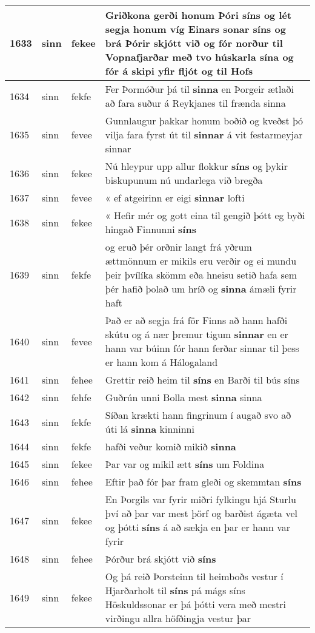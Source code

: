 \documentclass{article}
\begin{document}
\begin{longtable}{p{1cm}|p{1cm}|p{1cm}|p{13cm}}
\hline
1633&sinn&fekee&Griðkona gerði honum Þóri \textbf{síns} og lét segja honum víg Einars sonar síns og brá Þórir skjótt við og fór norður til Vopnafjarðar með tvo húskarla sína og fór á skipi yfir fljót og til Hofs\\
\hline
1634&sinn&fekfe&Fer Þormóður þá til \textbf{sinna} en Þorgeir ætlaði að fara suður á Reykjanes til frænda sinna\\
\hline
1635&sinn&fevee&Gunnlaugur þakkar honum boðið og kveðst þó vilja fara fyrst út til \textbf{sinnar} á vit festarmeyjar sinnar\\
\hline
1636&sinn&fekee&Nú hleypur upp allur flokkur \textbf{síns} og þykir biskupunum nú undarlega við bregða\\
\hline
1637&sinn&fevee&« ef atgeirinn er eigi \textbf{sinnar} lofti\\
\hline
1638&sinn&fekee&« Hefir mér og gott eina til gengið þótt eg byði hingað Finnunni \textbf{síns} \\
\hline
1639&sinn&fekfe&og eruð þér orðnir langt frá yðrum ættmönnum er mikils eru verðir og ei mundu þeir þvílíka skömm eða hneisu setið hafa sem þér hafið þolað um hríð og \textbf{sinna} ámæli fyrir haft\\
\hline
1640&sinn&fevee&Það er að segja frá för Finns að hann hafði skútu og á nær þremur tigum \textbf{sinnar} en er hann var búinn fór hann ferðar sinnar til þess er hann kom á Hálogaland\\
\hline
1641&sinn&fehee&Grettir reið heim til \textbf{síns} en Barði til bús síns\\
\hline
1642&sinn&fehfe&Guðrún unni Bolla mest \textbf{sinna} sinna\\
\hline
1643&sinn&fekfe&Síðan krækti hann fingrinum í augað svo að úti lá \textbf{sinna} kinninni\\
\hline
1644&sinn&fekfe&hafði veður komið mikið \textbf{sinna} \\
\hline
1645&sinn&fekee&Þar var og mikil ætt \textbf{síns} um Foldina\\
\hline
1646&sinn&fehee&Eftir það fór þar fram gleði og skemmtan \textbf{síns} \\
\hline
1647&sinn&fekee&En Þorgils var fyrir miðri fylkingu hjá Sturlu því að þar var mest þörf og barðist ágæta vel og þótti \textbf{síns} á að sækja en þar er hann var fyrir\\
\hline
1648&sinn&fehee&Þórður brá skjótt við \textbf{síns} \\
\hline
1649&sinn&fekee&Og þá reið Þorsteinn til heimboðs vestur í Hjarðarholt til \textbf{síns} pá mágs síns Höskuldssonar er þá þótti vera með mestri virðingu allra höfðingja vestur þar\\

\end{longtable}
\end{document}

